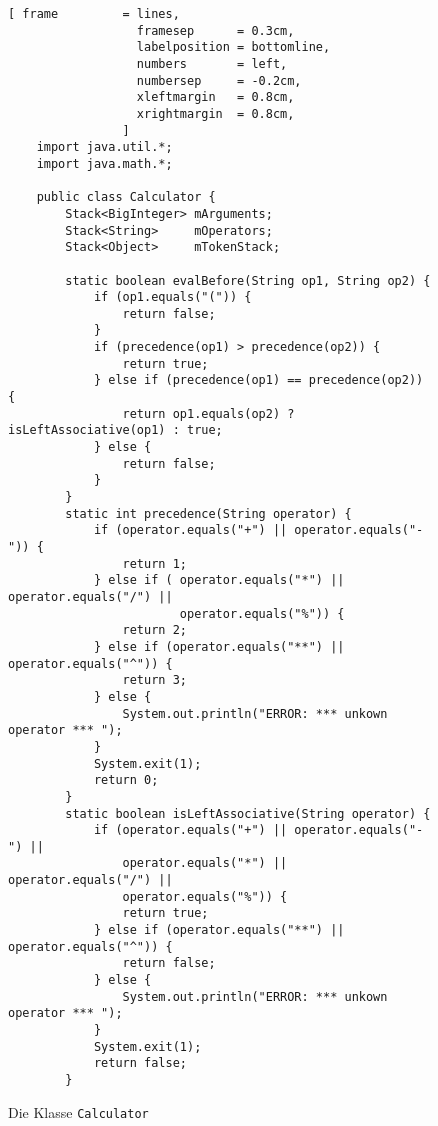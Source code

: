 \begin{figure}[!b]
  \centering
\begin{Verbatim}[ frame         = lines, 
                  framesep      = 0.3cm, 
                  labelposition = bottomline,
                  numbers       = left,
                  numbersep     = -0.2cm,
                  xleftmargin   = 0.8cm,
                  xrightmargin  = 0.8cm,
                ]
    import java.util.*; 
    import java.math.*;
    
    public class Calculator {
        Stack<BigInteger> mArguments;
        Stack<String>     mOperators;
        Stack<Object>     mTokenStack;
        
        static boolean evalBefore(String op1, String op2) {
            if (op1.equals("(")) {
                return false;
            }
            if (precedence(op1) > precedence(op2)) {
                return true;
            } else if (precedence(op1) == precedence(op2)) {
                return op1.equals(op2) ? isLeftAssociative(op1) : true;
            } else {
                return false;
            }
        }       
        static int precedence(String operator) {
            if (operator.equals("+") || operator.equals("-")) {
                return 1;
            } else if ( operator.equals("*") || operator.equals("/") || 
                        operator.equals("%")) {
                return 2;
            } else if (operator.equals("**") || operator.equals("^")) {
                return 3;
            } else {
                System.out.println("ERROR: *** unkown operator *** ");
            }
            System.exit(1);
            return 0;
        }    
        static boolean isLeftAssociative(String operator) {
            if (operator.equals("+") || operator.equals("-") ||
                operator.equals("*") || operator.equals("/") || 
                operator.equals("%")) {
                return true;
            } else if (operator.equals("**") || operator.equals("^")) {
                return false;
            } else {
                System.out.println("ERROR: *** unkown operator *** ");
            }
            System.exit(1);
            return false;
        }
\end{Verbatim}
\vspace*{-0.3cm}
  \caption{Die Klasse \texttt{Calculator}}
  \label{fig:calculator.java}
\end{figure} 

